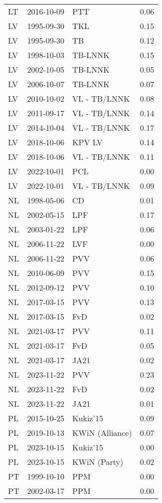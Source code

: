 \begin{longtable}{lllr}
  LT & 2016-10-09 & PTT & 0.06 \\ 
  LV & 1995-09-30 & TKL & 0.15 \\ 
  LV & 1995-09-30 & TB & 0.12 \\ 
  LV & 1998-10-03 & TB-LNNK & 0.15 \\ 
  LV & 2002-10-05 & TB-LNNK & 0.05 \\ 
  LV & 2006-10-07 & TB-LNNK & 0.07 \\ 
  LV & 2010-10-02 & VL - TB/LNNK & 0.08 \\ 
  LV & 2011-09-17 & VL - TB/LNNK & 0.14 \\ 
  LV & 2014-10-04 & VL - TB/LNNK & 0.17 \\ 
  LV & 2018-10-06 & KPV LV & 0.14 \\ 
  LV & 2018-10-06 & VL - TB/LNNK & 0.11 \\ 
  LV & 2022-10-01 & PCL & 0.00 \\ 
  LV & 2022-10-01 & VL - TB/LNNK & 0.09 \\ 
  NL & 1998-05-06 & CD & 0.01 \\ 
  NL & 2002-05-15 & LPF & 0.17 \\ 
  NL & 2003-01-22 & LPF & 0.06 \\ 
  NL & 2006-11-22 & LVF & 0.00 \\ 
  NL & 2006-11-22 & PVV & 0.06 \\ 
  NL & 2010-06-09 & PVV & 0.15 \\ 
  NL & 2012-09-12 & PVV & 0.10 \\ 
  NL & 2017-03-15 & PVV & 0.13 \\ 
  NL & 2017-03-15 & FvD & 0.02 \\ 
  NL & 2021-03-17 & PVV & 0.11 \\ 
  NL & 2021-03-17 & FvD & 0.05 \\ 
  NL & 2021-03-17 & JA21 & 0.02 \\ 
  NL & 2023-11-22 & PVV & 0.23 \\ 
  NL & 2023-11-22 & FvD & 0.02 \\ 
  NL & 2023-11-22 & JA21 & 0.01 \\ 
  PL & 2015-10-25 & Kukiz'15 & 0.09 \\ 
  PL & 2019-10-13 & KWiN (Alliance) & 0.07 \\ 
  PL & 2023-10-15 & Kukiz'15 & 0.00 \\ 
  PL & 2023-10-15 & KWiN (Party) & 0.02 \\ 
  PT & 1999-10-10 & PPM & 0.00 \\ 
  PT & 2002-03-17 & PPM & 0.00 \\ 

\end{longtable}
